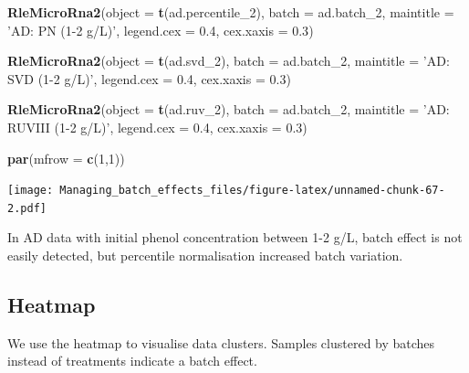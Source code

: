 \documentclass[]{book}
\newenvironment{Shaded}{\begin{snugshade}}{\end{snugshade}}
\newcommand{\KeywordTok}[1]{\textcolor[rgb]{0.13,0.29,0.53}{\textbf{#1}}}
\newcommand{\DataTypeTok}[1]{\textcolor[rgb]{0.13,0.29,0.53}{#1}}
\newcommand{\DecValTok}[1]{\textcolor[rgb]{0.00,0.00,0.81}{#1}}
\newcommand{\FloatTok}[1]{\textcolor[rgb]{0.00,0.00,0.81}{#1}}
\newcommand{\StringTok}[1]{\textcolor[rgb]{0.31,0.60,0.02}{#1}}
\newcommand{\NormalTok}[1]{#1}
\begin{document}
\begin{Shaded}
\begin{Highlighting}[]
\KeywordTok{RleMicroRna2}\NormalTok{(}\DataTypeTok{object =} \KeywordTok{t}\NormalTok{(ad.percentile_}\DecValTok{2}\NormalTok{), }\DataTypeTok{batch =}\NormalTok{ ad.batch_}\DecValTok{2}\NormalTok{, }
             \DataTypeTok{maintitle =} \StringTok{'AD: PN (1-2 g/L)'}\NormalTok{, }\DataTypeTok{legend.cex =} \FloatTok{0.4}\NormalTok{, }
             \DataTypeTok{cex.xaxis =} \FloatTok{0.3}\NormalTok{)}

\KeywordTok{RleMicroRna2}\NormalTok{(}\DataTypeTok{object =} \KeywordTok{t}\NormalTok{(ad.svd_}\DecValTok{2}\NormalTok{), }\DataTypeTok{batch =}\NormalTok{ ad.batch_}\DecValTok{2}\NormalTok{, }
             \DataTypeTok{maintitle =} \StringTok{'AD: SVD (1-2 g/L)'}\NormalTok{, }\DataTypeTok{legend.cex =} \FloatTok{0.4}\NormalTok{, }
             \DataTypeTok{cex.xaxis =} \FloatTok{0.3}\NormalTok{)}

\KeywordTok{RleMicroRna2}\NormalTok{(}\DataTypeTok{object =} \KeywordTok{t}\NormalTok{(ad.ruv_}\DecValTok{2}\NormalTok{), }\DataTypeTok{batch =}\NormalTok{ ad.batch_}\DecValTok{2}\NormalTok{, }
             \DataTypeTok{maintitle =} \StringTok{'AD: RUVIII (1-2 g/L)'}\NormalTok{, }\DataTypeTok{legend.cex =} \FloatTok{0.4}\NormalTok{, }
             \DataTypeTok{cex.xaxis =} \FloatTok{0.3}\NormalTok{)}

\KeywordTok{par}\NormalTok{(}\DataTypeTok{mfrow =} \KeywordTok{c}\NormalTok{(}\DecValTok{1}\NormalTok{,}\DecValTok{1}\NormalTok{))}
\end{Highlighting}
\end{Shaded}

\texttt{[image: Managing\_batch\_effects\_files/figure-latex/unnamed-chunk-67-2.pdf]}

In AD data with initial phenol concentration between 1-2 g/L, batch
effect is not easily detected, but percentile normalisation increased
batch variation.

\subsection{Heatmap}\label{heatmap-1}

We use the heatmap to visualise data clusters. Samples clustered by
batches instead of treatments indicate a batch effect.
\end{document}
